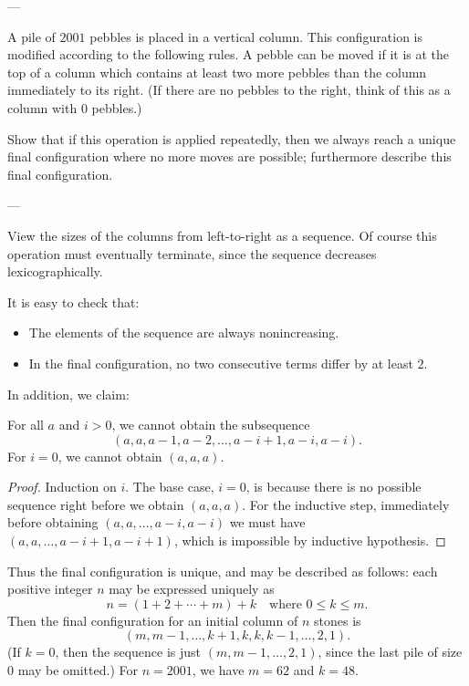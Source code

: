
---

A pile of $2001$ pebbles is placed in a vertical column. This configuration is modified according to the following rules. A pebble can be moved if it is at the top of a column which contains at least two more pebbles than the column immediately to its right. (If there are no pebbles to the right, think of this as a column with $0$ pebbles.)

Show that if this operation is applied repeatedly, then we always reach a unique final configuration where no more moves are possible; furthermore describe this final configuration.

---

View the sizes of the columns from left-to-right as a sequence. Of course this operation must eventually terminate, since the sequence decreases lexicographically.

It is easy to check that:
\begin{itemize}[itemsep=0em]
    \item The elements of the sequence are always nonincreasing.
    \item In the final configuration, no two consecutive terms differ by at least $2$.
\end{itemize}
In addition, we claim:
\begin{iclaim*}
    For all $a$ and $i>0$, we cannot obtain the subsequence \[(a,a,a-1,a-2,\ldots,a-i+1,a-i,a-i).\]
    For $i=0$, we cannot obtain $(a,a,a)$.
\end{iclaim*}
\begin{proof}
    Induction on $i$. The base case, $i=0$, is because there is no possible sequence right before we obtain $(a,a,a)$. For the inductive step, immediately before obtaining $(a,a,\ldots,a-i,a-i)$ we must have $(a,a,\ldots,a-i+1,a-i+1)$, which is impossible by inductive hypothesis.
\end{proof}

Thus the final configuration is unique, and may be described as follows: each positive integer $n$ may be expressed uniquely as \[n=(1+2+\cdots+m)+k\quad\text{where }0\le k\le m.\]
Then the final configuration for an initial column of $n$ stones is \[(m,m-1,\ldots,k+1,k,k,k-1,\ldots,2,1).\]
(If $k=0$, then the sequence is just $(m,m-1,\ldots,2,1)$, since the last pile of size $0$ may be omitted.) For $n=2001$, we have $m=62$ and $k=48$.

